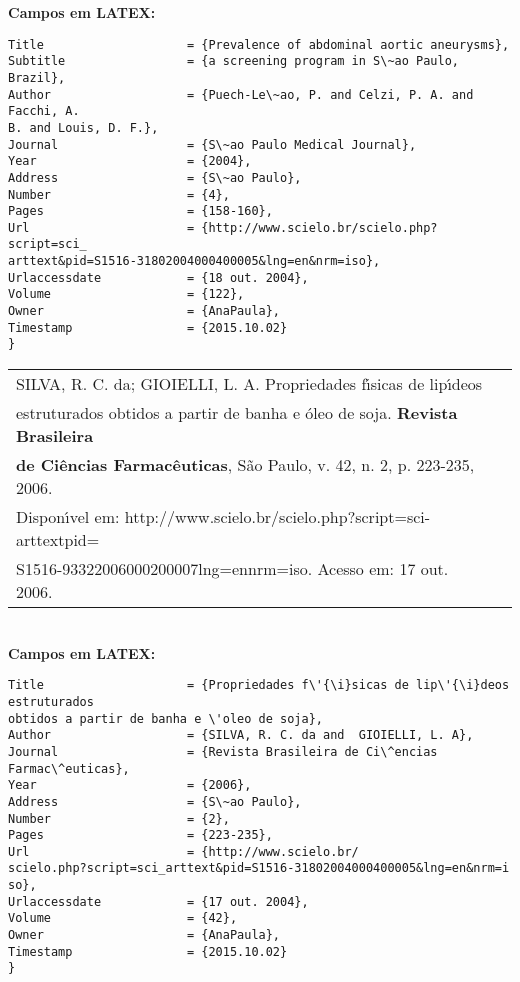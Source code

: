 \textbf{Campos em LATEX:} 

\begin{verbatim}
Title                    = {Prevalence of abdominal aortic aneurysms},
Subtitle                 = {a screening program in S\~ao Paulo, Brazil},
Author                   = {Puech-Le\~ao, P. and Celzi, P. A. and Facchi, A. 
B. and Louis, D. F.},
Journal                  = {S\~ao Paulo Medical Journal},
Year                     = {2004},
Address                  = {S\~ao Paulo},
Number                   = {4},
Pages                    = {158-160},
Url                      = {http://www.scielo.br/scielo.php?script=sci_
arttext&pid=S1516-31802004000400005&lng=en&nrm=iso},
Urlaccessdate            = {18 out. 2004},
Volume                   = {122},
Owner                    = {AnaPaula},
Timestamp                = {2015.10.02}
}
\end{verbatim}

\begin{tabular}{|l|c|} \hline
	SILVA, R. C. da; GIOIELLI, L. A. Propriedades f\'{\i}sicas de lip\'{\i}deos \\estruturados obtidos a partir de banha e \'oleo de soja. \textbf{Revista Brasileira} \\\textbf{de Ci\^encias Farmac\^euticas}, S\~ao Paulo, v. 42, n. 2, p. 223-235, 2006.\\
	Dispon\'{\i}vel em: http://www.scielo.br/scielo.php?script=sci-arttextpid=\\
	S1516-93322006000200007lng=ennrm=iso. Acesso em: 17 out. 2006. \\\hline
\end{tabular} \\

\textbf{Campos em LATEX:} 

\begin{verbatim}
Title                    = {Propriedades f\'{\i}sicas de lip\'{\i}deos estruturados
obtidos a partir de banha e \'oleo de soja},
Author                   = {SILVA, R. C. da and  GIOIELLI, L. A},
Journal                  = {Revista Brasileira de Ci\^encias
Farmac\^euticas},
Year                     = {2006},
Address                  = {S\~ao Paulo},
Number                   = {2},
Pages                    = {223-235},
Url                      = {http://www.scielo.br/
scielo.php?script=sci_arttext&pid=S1516-31802004000400005&lng=en&nrm=i
so},
Urlaccessdate            = {17 out. 2004},
Volume                   = {42},
Owner                    = {AnaPaula},
Timestamp                = {2015.10.02}
}
\end{verbatim}

